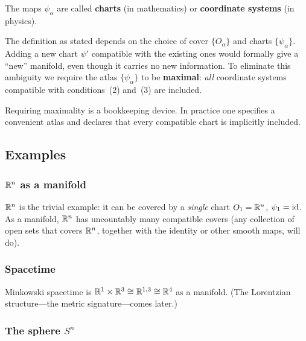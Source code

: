 The maps $\psi_\alpha$ are called \textbf{charts} (in mathematics)
or \textbf{coordinate systems} (in physics).

The definition as stated depends on the choice of cover
$\{O_\alpha\}$ and charts $\{\psi_\alpha\}$.
Adding a new chart $\psi'$ compatible with the existing ones
would formally give a ``new'' manifold, even though it carries
no new information.  To eliminate this ambiguity we require the
atlas $\{\psi_\alpha\}$ to be \textbf{maximal}: \emph{all}
coordinate systems compatible with conditions~(2) and~(3) are
included.

\begin{intuition}
  Requiring maximality is a bookkeeping device.
  In practice one specifies a convenient atlas and declares
  that every compatible chart is implicitly included.
\end{intuition}

\subsection{Examples}\label{sec:manifold-examples}

\subsubsection{$\mathbb{R}^{n}$ as a manifold}

$\mathbb{R}^{n}$ is the trivial example: it can be covered by a
\emph{single} chart $O_1 = \mathbb{R}^{n}$, $\psi_1 = \operatorname{id}$.
As a manifold, $\mathbb{R}^{n}$ has uncountably many compatible covers
(any collection of open sets that covers $\mathbb{R}^{n}$, together with
the identity or other smooth maps, will do).

\subsubsection{Spacetime}

Minkowski spacetime is $\mathbb{R}^1\times\mathbb{R}^3 \cong \mathbb{R}^{1,3} \cong \mathbb{R}^{4}$
as a manifold.  (The Lorentzian structure---the metric
signature---comes later.)

\subsubsection{The sphere $S^n$}
\label{sec:sphere}

